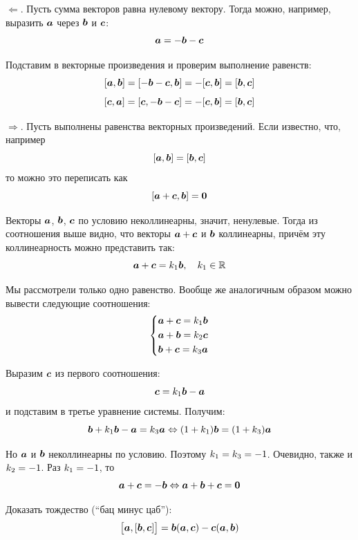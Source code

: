 \documentclass[a4paper,12pt]{article}
\begin{document}
  \begin{solution}
    \leavevmode
    
    $\Leftarrow$.
    Пусть сумма векторов равна нулевому вектору.
    Тогда можно, например, выразить $\boldsymbol a$ через $\boldsymbol b$ и $\boldsymbol c$:
    \[
      \boldsymbol a = -\boldsymbol b - \boldsymbol c
    \]
    
    Подставим в векторные произведения и проверим выполнение равенств:
    \[
      [\boldsymbol a, \boldsymbol b] = [-\boldsymbol b - \boldsymbol c, \boldsymbol b]
      = -[\boldsymbol c, \boldsymbol b] = [\boldsymbol b, \boldsymbol c]
    \]
    \[
      [\boldsymbol c, \boldsymbol a] = [\boldsymbol c, -\boldsymbol b - \boldsymbol c]
      = -[\boldsymbol c, \boldsymbol b] = [\boldsymbol b, \boldsymbol c]
    \]
    
    \medskip
    
    $\Rightarrow$.
    Пусть выполнены равенства векторных произведений.
    Если известно, что, например
    \[
      [\boldsymbol a, \boldsymbol b] = [\boldsymbol b, \boldsymbol c]
    \]
    то можно это переписать как
    \[
      [\boldsymbol a + \boldsymbol c, \boldsymbol b] = \boldsymbol 0
    \]
    
    Векторы $\boldsymbol a$, $\boldsymbol b$, $\boldsymbol c$ по условию неколлинеарны, значит, ненулевые.
    Тогда из соотношения выше видно, что векторы $\bds a \hm+ \bds c$ и $\boldsymbol b$ коллинеарны, причём эту коллинеарность можно представить так:
    \[
      \boldsymbol a + \boldsymbol c = k_1 \boldsymbol b,\quad k_1 \in \operatorname{\mathbb R}
    \]
    
    Мы рассмотрели только одно равенство.
    Вообще же аналогичным образом можно вывести следующие соотношения:
    \[
      \left\{
        \begin{aligned}
          &\boldsymbol a + \boldsymbol c = k_1 \boldsymbol b\\
          &\boldsymbol a + \boldsymbol b = k_2 \boldsymbol c\\
          &\boldsymbol b + \boldsymbol c = k_3 \boldsymbol a
        \end{aligned}
      \right.
    \]
    
    Выразим $\boldsymbol c$ из первого соотношения:
    \[
      \boldsymbol c = k_1 \boldsymbol b - \boldsymbol a
    \]
    и подставим в третье уравнение системы.
    Получим:
    \[
      \boldsymbol b + k_1 \boldsymbol b - \boldsymbol a = k_3 \boldsymbol a \Leftrightarrow (1 + k_1) \boldsymbol b = (1 + k_3) \boldsymbol a
    \]
    
    Но $\boldsymbol a$ и $\boldsymbol b$ неколлинеарны по условию.
    Поэтому $k_1 \hm= k_3 \hm= -1$.
    Очевидно, также и $k_2 \hm= -1$.
    Раз $k_1 \hm= -1$, то
    \[
      \boldsymbol a + \boldsymbol c = -\boldsymbol b \Leftrightarrow \boldsymbol a + \boldsymbol b + \boldsymbol c = \boldsymbol 0
    \]
  \end{solution}
  
  
  \begin{problem}[3.13(2)]
    Доказать тождество (``бац минус цаб''):
    \[
      \bigl[\boldsymbol a, [\boldsymbol b, \boldsymbol c]\bigr] = \boldsymbol b (\boldsymbol a, \boldsymbol c) - \boldsymbol c (\boldsymbol a, \boldsymbol b)
    \]
  \end{problem}
  
\end{document}
